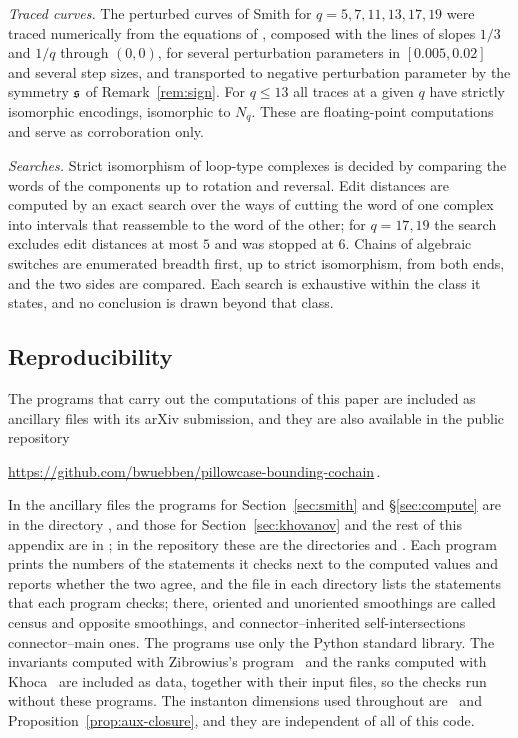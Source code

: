 \emph{Traced curves.}  The perturbed curves of Smith for $q=5,7,11,13,17,19$ were traced numerically
from the equations of \cite[Prop.~4.1]{Smith}, composed with the lines of slopes $1/3$ and $1/q$
through $(0,0)$, for several perturbation parameters in $[0.005,0.02]$ and several step sizes, and
transported to negative perturbation parameter by the symmetry $\mathfrak{s}$ of Remark~\ref{rem:sign}.  For
$q\le13$ all traces at a given $q$ have strictly isomorphic encodings, isomorphic to $N_q$.  These are
floating-point computations and serve as corroboration only.

\emph{Searches.}  Strict isomorphism of loop-type complexes is decided by comparing the words of the
components up to rotation and reversal.  Edit distances are computed by an exact search over the ways
of cutting the word of one complex into intervals that reassemble to the word of the other; for
$q=17,19$ the search excludes edit distances at most $5$ and was stopped at $6$.  Chains of algebraic
switches are enumerated breadth first, up to strict isomorphism, from both ends, and the two sides are
compared.  Each search is exhaustive within the class it states, and no conclusion is drawn beyond
that class.

\subsection{Reproducibility}\label{ss:repro}
The programs that carry out the computations of this paper are included as ancillary files with its
arXiv submission, and they are also available in the public repository
\begin{center}
\url{https://github.com/bwuebben/pillowcase-bounding-cochain}\,.
\end{center}
In the ancillary files the programs for Section~\ref{sec:smith} and \S\ref{sec:compute} are in the directory
, and those for Section~\ref{sec:khovanov} and the rest of this appendix are in ; in the repository these are the
directories  and . Each program prints the numbers of the statements it checks next to the computed values and reports whether the two agree, and the file  in each directory
lists the statements that each program checks; there, oriented and unoriented smoothings are called census
and opposite smoothings, and connector--inherited self-intersections connector--main ones. The programs use only
the Python standard library. The invariants
computed with Zibrowius's program~\cite{Zibkht} and the ranks computed with Khoca~\cite{Khoca} are included as
data, together with their input files, so the checks run without these programs. The instanton dimensions used
throughout are~\cite[Thm.~1.1]{WuebbenII} and Proposition~\ref{prop:aux-closure}, and they are independent of all
of this code.
